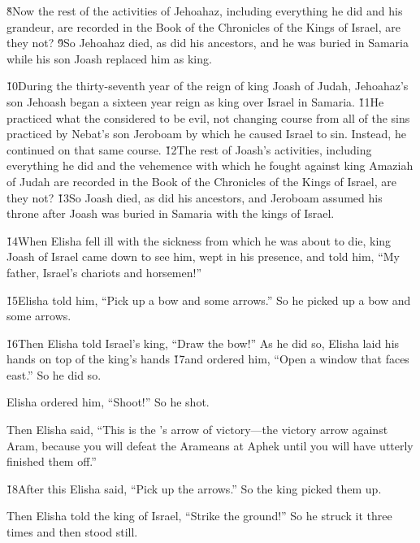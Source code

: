 \v{8}Now the rest of the activities of Jehoahaz, including everything he did and his grandeur, are recorded in the Book of the Chronicles of the Kings of Israel, are they not? \v{9}So Jehoahaz died, as did his ancestors, and he was buried in Samaria while his son Joash replaced him as king.

\v{10}During the thirty-seventh year of the reign of king Joash of Judah, Jehoahaz's son Jehoash began a sixteen year reign as king over Israel in Samaria. \v{11}He practiced what the  considered to be evil, not changing course from all of the sins practiced by Nebat's son Jeroboam by which he caused Israel to sin. Instead, he continued on that same course. \v{12}The rest of Joash's activities, including everything he did and the vehemence with which he fought against king Amaziah of Judah are recorded in the Book of the Chronicles of the Kings of Israel, are they not? \v{13}So Joash died, as did his ancestors, and Jeroboam assumed his throne after Joash was buried in Samaria with the kings of Israel.

\v{14}When Elisha fell ill with the sickness from which he was about to die, king Joash of Israel came down to see him, wept in his presence, and told him, ``My father, Israel's chariots and horsemen!''

\v{15}Elisha told him, ``Pick up a bow and some arrows.'' So he picked up a bow and some arrows.

\v{16}Then Elisha told Israel's king, ``Draw the bow!'' As he did so, Elisha laid his hands on top of the king's hands \v{17}and ordered him, ``Open a window that faces east.'' So he did so.

Elisha ordered him, ``Shoot!'' So he shot.

Then Elisha said, ``This is the 's arrow of victory---the victory arrow against Aram, because you will defeat the Arameans at Aphek until you will have utterly finished them off.''

\v{18}After this Elisha said, ``Pick up the arrows.'' So the king picked them up.

Then Elisha told the king of Israel, ``Strike the ground!'' So he struck it three times and then stood still.

